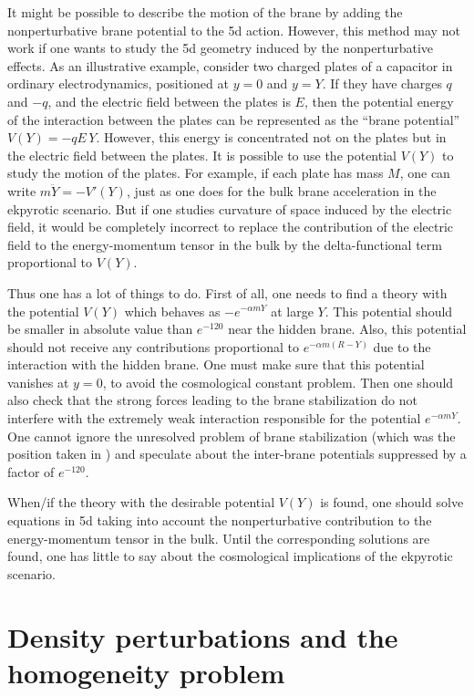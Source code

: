 \documentclass[a4paper,12pt]{article}
\begin{document}
It might be possible to describe the motion of the brane by adding the nonperturbative brane potential to the 5d action. However, this method may not work if one wants to study the 5d geometry induced by the nonperturbative effects. 
As an illustrative example, consider two charged plates of a capacitor in   
ordinary electrodynamics, positioned at $y = 0$ and $y = Y$. If they have   
charges $q$ and $-q$, and the electric field between the plates is $E$,   
then the potential energy of the interaction between the plates can be   
represented as the ``brane potential'' $V(Y) = -qE\,Y$. However, this energy is concentrated not on the plates but in the electric field between the plates. It is possible to use the potential $V(Y)$ to study the motion of the plates. For example, if each plate has mass $M$, one can write $m\ddot Y = -V'(Y)$, just as one does for the bulk brane acceleration in the ekpyrotic scenario. But if one studies curvature of space induced by the electric field, it would be completely incorrect to replace the contribution of the electric field to the energy-momentum tensor in the bulk by the delta-functional term proportional to $V(Y)$.  

   
Thus  one has  a lot of things to do. First of all, one needs to find a   
theory with the potential $V(Y)$ which behaves as $-e^{-\alpha m Y}$ at   
large $Y$. This potential should be   
smaller in absolute value than $e^{-120}$ near the hidden brane. Also, this potential should not receive any contributions   
proportional to $e^{-\alpha m (R-Y)}$ due to the interaction with the   
hidden brane.  One must make sure that this potential vanishes at $y = 0$, to avoid the cosmological constant problem. Then one    
should also check that the strong forces leading to the brane   
stabilization do not interfere with the extremely weak interaction   
responsible for the potential $e^{-\alpha m Y}$. One cannot ignore the   
unresolved problem of brane stabilization (which was the position taken in   
\cite{KOST}) and speculate about the inter-brane potentials suppressed by   
a factor of $e^{-120}$.   
   
When/if the theory with the desirable potential $V(Y)$ is found, one should solve equations in 5d taking into account the nonperturbative contribution to the energy-momentum tensor in the bulk.    Until the corresponding solutions are found, one has little to say about the cosmological implications of the ekpyrotic scenario.

\section{Density perturbations and the homogeneity problem}
\end{document}
